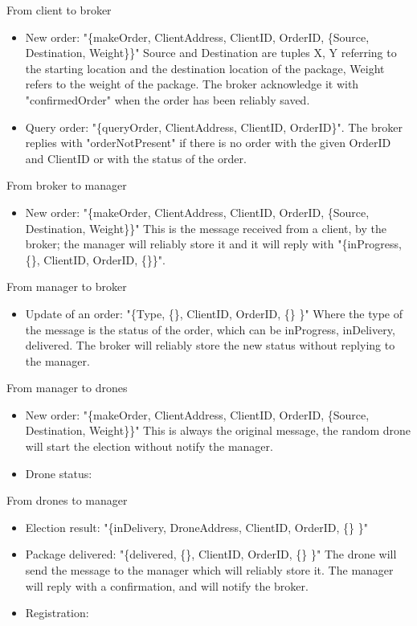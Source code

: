 \documentclass[a4paper, oneside]{memoir}
\begin{document}
From client to broker
\begin{itemize}
	\item New order: "\{makeOrder, ClientAddress, ClientID, OrderID, \{Source, Destination, Weight\}\}"
	Source and Destination are tuples {X, Y} referring to the starting location and the destination location of the package, Weight refers to the weight of the package. The broker acknowledge it with "confirmedOrder" when the order has been reliably saved.

	\item Query order: "\{queryOrder, ClientAddress, ClientID, OrderID\}". The broker replies with "orderNotPresent" if there is no order with the given OrderID and ClientID or with the status of the order.
\end{itemize} \vspace{1em}
From broker to manager
\begin{itemize}
	\item New order: "\{makeOrder, ClientAddress, ClientID, OrderID, \{Source, Destination, Weight\}\}"
	This is the message received from a client, by the broker; the manager will reliably store it and it will reply with "\{inProgress, \{\}, ClientID, OrderID, \{\}\}".
\end{itemize} \vspace{1em}
From manager to broker
\begin{itemize}
	\item Update of an order: "\{Type, \{\}, ClientID, OrderID, \{\} \}"
	Where the type of the message is the status of the order, which can be inProgress, inDelivery, delivered. The broker will reliably store the new status without replying to the manager.
\end{itemize}\vspace{1em}
From manager to drones
\begin{itemize}
	\item New order: "\{makeOrder, ClientAddress, ClientID, OrderID, \{Source, Destination, Weight\}\}"
	This is always the original message, the random drone will start the election without notify the manager.

	\item Drone status:
\end{itemize} \vspace{1em}
From drones to manager
\begin{itemize}
	\item Election result: "\{inDelivery, DroneAddress, ClientID, OrderID, \{\} \}"

	\item Package delivered: "\{delivered, \{\}, ClientID, OrderID, \{\} \}"
	The drone will send the message to the manager which will reliably store it. The manager will reply with a confirmation, and will notify the broker.

	\item Registration:
\end{itemize} \vspace{1em}
\end{document}
